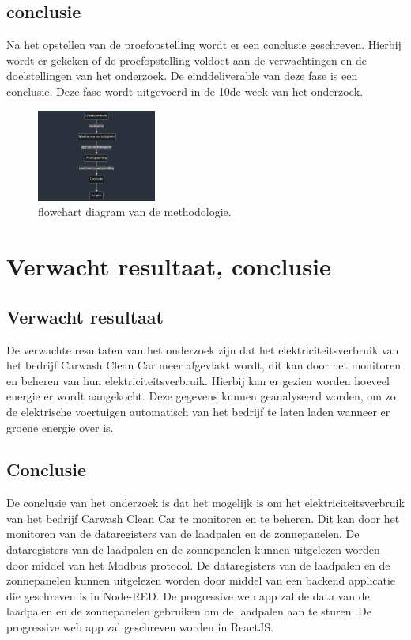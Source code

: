 \subsection{conclusie}%
\label{sub:conclusie_methodologie}
Na het opstellen van de proefopstelling wordt er een conclusie geschreven. Hierbij wordt er gekeken of de proefopstelling voldoet aan de verwachtingen en de doelstellingen van het onderzoek. De einddeliverable van deze fase is een conclusie. Deze fase wordt uitgevoerd in de 10de week van het onderzoek.


\begin{figure}[b]
  \centering
  \includegraphics[width=0.35\textwidth,height=0.35\textheight,keepaspectratio]{./graphics/mermaid-diagram.png}
  \caption{flowchart diagram van de methodologie.}
  \label{fig:flowchart}
\end{figure}

\newpage
\section{Verwacht resultaat, conclusie}%
\label{sec:verwachte_resultaten}

\subsection{Verwacht resultaat}%
\label{sub:verwacht_resultaat}
De verwachte resultaten van het onderzoek zijn dat het elektriciteitsverbruik van het bedrijf Carwash Clean Car meer afgevlakt wordt, dit kan door het monitoren en beheren van hun elektriciteitsverbruik. Hierbij kan er gezien worden hoeveel energie er wordt aangekocht. Deze gegevens kunnen geanalyseerd worden, om zo de elektrische voertuigen automatisch van het bedrijf te laten laden wanneer er groene energie over is.

\subsection{Conclusie}%
\label{sub:conclusie}
De conclusie van het onderzoek is dat het mogelijk is om het elektriciteitsverbruik van het bedrijf Carwash Clean Car te monitoren en te beheren. Dit kan door het monitoren van de dataregisters van de laadpalen en de zonnepanelen. De dataregisters van de laadpalen en de zonnepanelen kunnen uitgelezen worden door middel van het Modbus protocol. De dataregisters van de laadpalen en de zonnepanelen kunnen uitgelezen worden door middel van een backend applicatie die geschreven is in Node-RED. De progressive web app zal de data van de laadpalen en de zonnepanelen gebruiken om de laadpalen aan te sturen. De progressive web app zal geschreven worden in ReactJS.